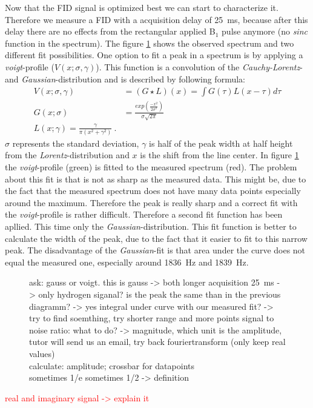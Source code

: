 Now that the FID signal is optimized best we can start to characterize it. Therefore we measure a FID with a acquisition delay of \SI{25}{\milli \second}, because after this delay there are no effects from the rectangular applied B$_1$ pulse anymore (no \textit{sinc} function in the spectrum). The figure \ref{fig:Pulsandcollect138_delay_25_gauss} shows the observed spectrum and two different fit possibilities.\newline
One option to fit a peak in a spectrum is by applying a \textit{voigt}-profile ($V(x;\sigma , \gamma)$). This function is a convolution of the \textit{Cauchy-Lorentz}- and \textit{Gaussian}-distribution and is described by following formula:
\begin{align}
    V(x;\sigma , \gamma) &= ( G \star L)(x) = \int G(\tau) L(x-\tau) d\tau \\
    G(x;\sigma) &= \frac{exp\left(\frac{-x^2}{2\sigma^2}\right)}{\sigma \sqrt{2 \pi}} \\
    L(x;\gamma) = \frac{\gamma}{\pi \left( x^2+\gamma^2\right)} \ .
    \label{eq: voigt} 
\end{align}
$\sigma$ represents the standard deviation, $\gamma$ is half of the peak width at half height from the \textit{Lorentz}-distribution and $x$ is the shift from the line center. In figure \ref{fig:Pulsandcollect138_delay_25_gauss} the \textit{voigt}-profile (green) is fitted to the measured spectrum (red). The problem about this fit is that is not as sharp as the measured data. This might be, due to the fact that the measured spectrum does not have many data points especially around the maximum. Therefore the peak is really sharp and a correct fit with the \textit{voigt}-profile is rather difficult. Therefore a second fit function has been apllied. This time only the \textit{Gaussian}-distribution. This fit function is better to calculate the width of the peak, due to the fact that it easier to fit to this narrow peak. The disadvantage of the \textit{Gaussian}-fit is that area under the curve does not equal the measured one, especially around \SI{1836}{\hertz} and \SI{1839}{\hertz}. 
\begin{figure}[H]
    \centering
    
    \caption[]{ask: gauss or voigt. this is gauss -> both\newline
    longer acquisition \SI{25}{\milli \second} -> only hydrogen siganal? is the peak the same than in the previous diagramm?  -> yes\newline
    integral under curve with our measured fit? -> try to find soemthing, try shorter range and more points\newline
    signal to noise ratio: what to do? -> magnitude, which unit is the amplitude, tutor will send us an email, try back fouriertransform (only keep real values)
    \\
    calculate: amplitude; crossbar for datapoints\\
    sometimes 1/e sometimes 1/2 -> definition}
    \label{fig:Pulsandcollect138_delay_25_gauss}
\end{figure}

\textcolor{red}{real and imaginary signal -> explain it}